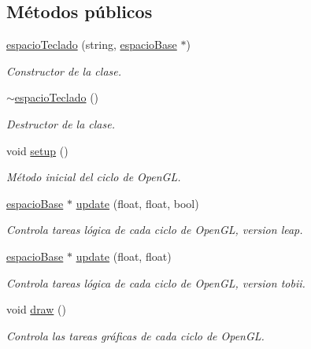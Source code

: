 \subsection*{Métodos públicos}
\begin{DoxyCompactItemize}
\item 
\hyperlink{classespacio_teclado_a7bdaaa950b5673a464f322382aaf95cd}{espacio\+Teclado} (string, \hyperlink{classespacio_base}{espacio\+Base} $\ast$)
\begin{DoxyCompactList}\small\item\em Constructor de la clase. \end{DoxyCompactList}\item 
\hyperlink{classespacio_teclado_a98b147b70f0ce7a5bc6805d786f84cc4}{$\sim$espacio\+Teclado} ()
\begin{DoxyCompactList}\small\item\em Destructor de la clase. \end{DoxyCompactList}\item 
void \hyperlink{classespacio_teclado_ac6bad9b2d302639b45fbee4aed2f094d}{setup} ()
\begin{DoxyCompactList}\small\item\em Método inicial del ciclo de Open\+G\+L. \end{DoxyCompactList}\item 
\hyperlink{classespacio_base}{espacio\+Base} $\ast$ \hyperlink{classespacio_teclado_aebd1d8eda29a8c5d162c00021d6d7a56}{update} (float, float, bool)
\begin{DoxyCompactList}\small\item\em Controla tareas lógica de cada ciclo de Open\+G\+L, version leap. \end{DoxyCompactList}\item 
\hyperlink{classespacio_base}{espacio\+Base} $\ast$ \hyperlink{classespacio_teclado_a524ed574de9efe7be06c060c55eff416}{update} (float, float)
\begin{DoxyCompactList}\small\item\em Controla tareas lógica de cada ciclo de Open\+G\+L, version tobii. \end{DoxyCompactList}\item 
void \hyperlink{classespacio_teclado_a1215fd9d4030c2642d2fbe6a4cf86589}{draw} ()
\begin{DoxyCompactList}\small\item\em Controla las tareas gráficas de cada ciclo de Open\+G\+L. \end{DoxyCompactList}\end{DoxyCompactItemize}
